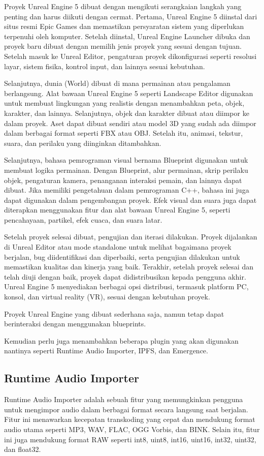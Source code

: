 Proyek Unreal Engine 5 dibuat dengan mengikuti serangkaian langkah yang penting dan harus diikuti dengan cermat. Pertama, Unreal Engine 5 diinstal dari situs resmi Epic Games dan memastikan persyaratan sistem yang diperlukan terpenuhi oleh komputer. Setelah diinstal, Unreal Engine Launcher dibuka dan proyek baru dibuat dengan memilih jenis proyek yang sesuai dengan tujuan. Setelah masuk ke Unreal Editor, pengaturan proyek dikonfigurasi seperti resolusi layar, sistem fisika, kontrol input, dan lainnya sesuai kebutuhan.

Selanjutnya, dunia (World) dibuat di mana permainan atau pengalaman berlangsung. Alat bawaan Unreal Engine 5 seperti Landscape Editor digunakan untuk membuat lingkungan yang realistis dengan menambahkan peta, objek, karakter, dan lainnya. Selanjutnya, objek dan karakter dibuat atau diimpor ke dalam proyek. Aset dapat dibuat sendiri atau model 3D yang sudah ada diimpor dalam berbagai format seperti FBX atau OBJ. Setelah itu, animasi, tekstur, suara, dan perilaku yang diinginkan ditambahkan.

Selanjutnya, bahasa pemrograman visual bernama Blueprint digunakan untuk membuat logika permainan. Dengan Blueprint, alur permainan, skrip perilaku objek, pengaturan kamera, penanganan interaksi pemain, dan lainnya dapat dibuat. Jika memiliki pengetahuan dalam pemrograman C++, bahasa ini juga dapat digunakan dalam pengembangan proyek. Efek visual dan suara juga dapat diterapkan menggunakan fitur dan alat bawaan Unreal Engine 5, seperti pencahayaan, partikel, efek cuaca, dan suara latar.

Setelah proyek selesai dibuat, pengujian dan iterasi dilakukan. Proyek dijalankan di Unreal Editor atau mode standalone untuk melihat bagaimana proyek berjalan, bug diidentifikasi dan diperbaiki, serta pengujian dilakukan untuk memastikan kualitas dan kinerja yang baik. Terakhir, setelah proyek selesai dan telah diuji dengan baik, proyek dapat didistribusikan kepada pengguna akhir. Unreal Engine 5 menyediakan berbagai opsi distribusi, termasuk platform PC, konsol, dan virtual reality (VR), sesuai dengan kebutuhan proyek.

Proyek Unreal Engine yang dibuat sederhana saja, namun tetap dapat berinteraksi dengan menggunakan blueprints.

Kemudian perlu juga menambahkan beberapa plugin yang akan digunakan nantinya seperti Runtime Audio Importer, IPFS, dan Emergence.

\subsection{Runtime Audio Importer}
Runtime Audio Importer adalah sebuah fitur yang memungkinkan pengguna untuk mengimpor audio dalam berbagai format secara langsung saat berjalan. Fitur ini menawarkan kecepatan transkoding yang cepat dan mendukung format audio utama seperti MP3, WAV, FLAC, OGG Vorbis, dan BINK. Selain itu, fitur ini juga mendukung format RAW seperti int8, uint8, int16, uint16, int32, uint32, dan float32.

